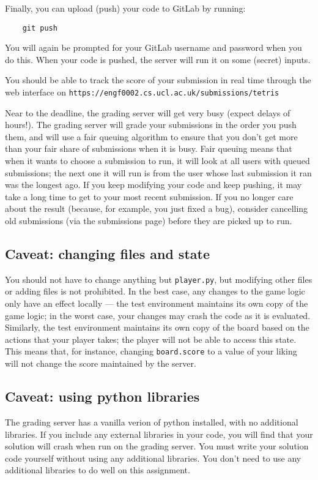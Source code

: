 \documentclass{article}
\begin{document}
Finally, you can upload (push) your code to GitLab by running:
\begin{verbatim}
    git push
\end{verbatim}
You will again be prompted for your GitLab username and password
when you do this. When your code is pushed, the server will run it on
some (secret) inputs.

You should be able to track the score of your submission in real time
through the web interface on
\texttt{https://engf0002.cs.ucl.ac.uk/submissions/tetris}

Near to the deadline, the grading server will get very busy (expect delays of hours!). The grading
server will grade your submissions in the order you push them, and
will use a fair queuing algorithm to ensure that you don’t get more
than your fair share of submissions when it is busy. Fair queuing
means that when it wants to choose a submission to run, it will look
at all users with queued submissions; the next one it will run is from
the user whose last submission it ran was the longest ago. If you keep
modifying your code and keep pushing, it may take a long time to get
to your most recent submission. If you no longer care about the result
(because, for example, you just fixed a bug), consider cancelling old
submissions (via the submissions page) before they are picked up to
run.

\subsection*{Caveat: changing files and state}
You should not have to change anything but \texttt{player.py}, but
modifying other files or adding files is not prohibited. In the best
case, any changes to the game logic only have an effect locally — the
test environment maintains its own copy of the game logic; in the
worst case, your changes may crash the code as it is
evaluated. Similarly, the test environment maintains its own copy of
the board based on the actions that your player takes; the player will
not be able to access this state. This means that, for instance,
changing \texttt{board.score} to a value of your liking will not
change the score maintained by the server.

\subsection*{Caveat: using python libraries}

The grading server has a vanilla verion of python installed, with no
additional libraries.  If you include any external libraries in your
code, you will find that your solution will crash when run on the
grading server.  You must write your solution code yourself without
using any additional libraries.  You don't need to use any additional
libraries to do well on this assignment.
\end{document}
